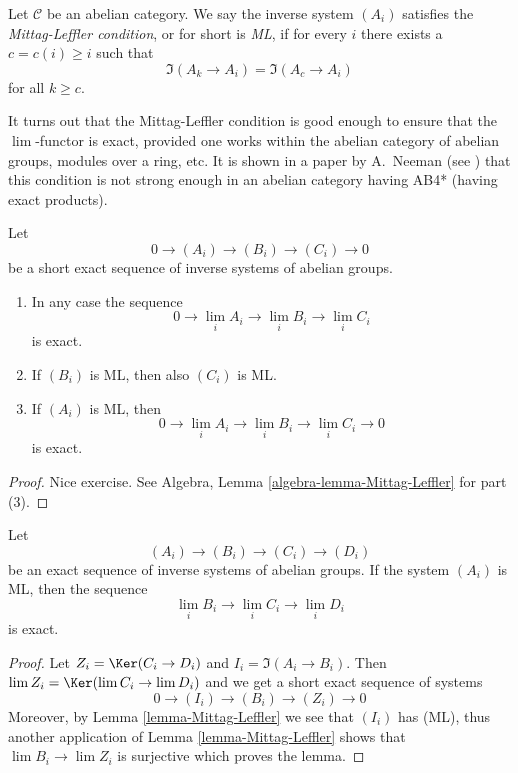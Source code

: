 \begin{definition}
\label{definition-Mittag-Leffler}
Let $\mathcal{C}$ be an abelian category.
We say the inverse system $(A_i)$
satisfies the {\it Mittag-Leffler condition}, or for short
is {\it ML}, if for every $i$ there exists a $c = c(i) \geq i$
such that
$$
\Im(A_k \to A_i) = \Im(A_c \to A_i)
$$
for all $k \geq c$.
\end{definition}

\noindent
It turns out that the Mittag-Leffler condition is good enough to ensure
that the $\lim$-functor is exact, provided one works within
the abelian category of abelian groups, modules over a ring, etc.
It is shown in a paper by A.\ Neeman (see \cite{Neeman-Counterexample})
that this condition is not strong enough in an abelian
category having AB4* (having exact products).

\begin{lemma}
\label{lemma-Mittag-Leffler}
Let
$$
0 \to (A_i) \to (B_i) \to (C_i) \to 0
$$
be a short exact sequence of inverse systems of abelian groups.
\begin{enumerate}
\item In any case the sequence
$$
0 \to \lim_i A_i \to \lim_i B_i \to \lim_i C_i
$$
is exact.
\item If $(B_i)$ is ML, then also $(C_i)$ is ML.
\item If $(A_i)$ is ML, then
$$
0 \to \lim_i A_i \to \lim_i B_i \to \lim_i C_i \to 0
$$
is exact.
\end{enumerate}
\end{lemma}

\begin{proof}
Nice exercise. See
Algebra, Lemma \ref{algebra-lemma-Mittag-Leffler} for part (3).
\end{proof}

\begin{lemma}
\label{lemma-apply-Mittag-Leffler}
Let
$$
(A_i) \to (B_i) \to (C_i) \to (D_i)
$$
be an exact sequence of inverse systems of abelian groups. If the
system $(A_i)$ is ML, then the sequence
$$
\lim_i B_i \to \lim_i C_i \to \lim_i D_i
$$
is exact.
\end{lemma}

\begin{proof}
Let $Z_i = \Ker(C_i \to D_i)$ and $I_i = \Im(A_i \to B_i)$.
Then $\lim Z_i = \Ker(\lim C_i \to \lim D_i)$ and
we get a short exact sequence of systems
$$
0 \to (I_i) \to (B_i) \to (Z_i) \to 0
$$
Moreover, by
Lemma \ref{lemma-Mittag-Leffler}
we see that $(I_i)$ has (ML), thus another application of
Lemma \ref{lemma-Mittag-Leffler}
shows that $\lim B_i \to \lim Z_i$ is surjective which
proves the lemma.
\end{proof}

